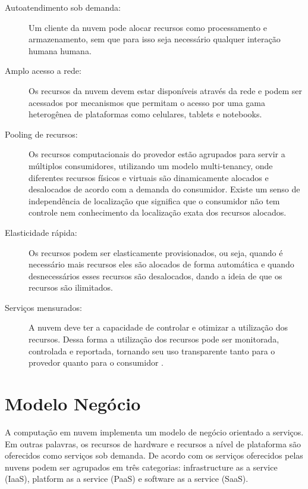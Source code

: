 \begin{description}

	\item[Autoatendimento sob demanda:] Um cliente da nuvem pode alocar recursos como processamento e armazenamento, sem que para isso seja necessário qualquer interação humana humana.
	
	\item[Amplo acesso a rede:] Os recursos da nuvem devem estar disponíveis através da rede e podem ser acessados por mecanismos que permitam o acesso por uma gama heterogênea de plataformas como celulares, tablets e notebooks.
	
	\item[Pooling de recursos:] Os recursos computacionais do provedor estão agrupados para servir a múltiplos consumidores, utilizando um modelo multi-tenancy, onde diferentes recursos físicos e virtuais são dinamicamente alocados e desalocados de acordo com a demanda do consumidor. Existe um senso de independência de localização que significa que o consumidor não tem controle nem conhecimento da localização exata dos recursos alocados.
	
	\item[Elasticidade rápida:] Os recursos podem ser elasticamente provisionados, ou seja, quando é necessário mais recursos eles são alocados de forma automática e quando desnecessários esses recursos são desalocados, dando a ideia de que os recursos são ilimitados.
	
	\item[Serviços mensurados:] A nuvem deve ter a capacidade de controlar e otimizar a utilização dos recursos. Dessa forma a utilização dos recursos pode ser monitorada, controlada e reportada, tornando seu uso transparente tanto para o provedor quanto para o consumidor .

\end{description} 



\section{Modelo Negócio} \label{cloud:bus}

A computação em nuvem implementa um modelo de negócio orientado a serviços. Em outras palavras, os recursos de hardware e recursos a nível de plataforma são oferecidos como serviços sob demanda. De acordo com \citep{stateOfArt:2010} os serviços oferecidos pelas nuvens podem ser agrupados em três categorias: infrastructure as a service (IaaS), platform as a service (PaaS) e software as a service (SaaS).

